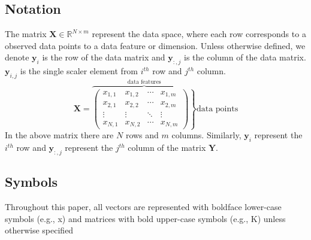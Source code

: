 \subsection{Notation}
The matrix $\textbf{X}\in\mathbb{R}^{N\times m}$ represent the data space, where each row corresponds to a observed data points to a data feature or dimension. Unless otherwise defined, we denote $\textbf{y}_i$ is the row of the data matrix and $\textbf{y}_{:,j}$ is the column of the data matrix. $\textbf{y}_{i,j}$ is the single scaler element from $i^{th}$ row and $j^{th}$ column.
\begin{equation*} \label{eq:notation}
\textbf{X} = \overbrace{\left.
 \begin{pmatrix}
  x_{1,1} & x_{1,2} & \cdots & x_{1,m} \\
  x_{2,1} & x_{2,2} & \cdots & x_{2,m} \\
  \vdots  & \vdots  & \ddots & \vdots  \\
  x_{N,1} & x_{N,2} & \cdots & x_{N,m} 
 \end{pmatrix}\right\rbrace }^{\text{data features}} \text{data points}
\end{equation*}
In the above matrix there are $N$ rows and $m$ columns. Similarly, $\textbf{y}_i$ represent the $i^{th}$ row and $\textbf{y}_{:,j}$ represent the $j^{th}$ column of the matrix $\textbf{Y}$.

\clearpage
\subsection{Symbols}
Throughout this paper, all vectors are represented with boldface lower-case symbols (e.g., x) and
matrices with bold upper-case symbols (e.g., K) unless otherwise specified %

